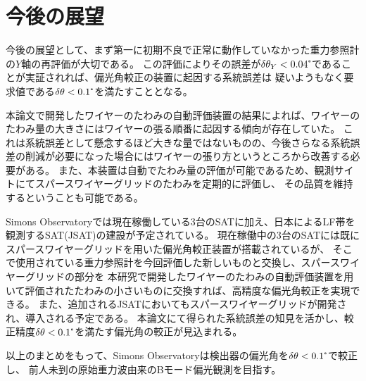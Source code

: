 \documentclass[../../main.tex]{subfiles}
\begin{document}
\section{今後の展望}
今後の展望として、まず第一に初期不良で正常に動作していなかった重力参照計の$Y$軸の再評価が大切である。
この評価によりその誤差が$\delta\theta_{Y}<0.04\tcdegree$であることが実証されれば、偏光角較正の装置に起因する系統誤差は
疑いようもなく要求値である$\delta\theta<0.1\tcdegree$を満たすこととなる。

本論文で開発したワイヤーのたわみの自動評価装置の結果によれば、ワイヤーのたわみ量の大きさにはワイヤーの張る順番に起因する傾向が存在していた。
これは系統誤差として懸念するほど大きな量ではないものの、今後さらなる系統誤差の削減が必要になった場合にはワイヤーの張り方というところから改善する必要がある。
また、本装置は自動でたわみ量の評価が可能であるため、観測サイトにてスパースワイヤーグリッドのたわみを定期的に評価し、
その品質を維持するということも可能である。

Simons Observatoryでは現在稼働している3台のSATに加え、日本によるLF帯を観測するSAT(JSAT)の建設が予定されている。
現在稼働中の3台のSATには既にスパースワイヤーグリッドを用いた偏光角較正装置が搭載されているが、
そこで使用されている重力参照計を今回評価した新しいものと交換し、スパースワイヤーグリッドの部分を
本研究で開発したワイヤーのたわみの自動評価装置を用いて評価されたたわみの小さいものに交換すれば、高精度な偏光角較正を実現できる。
また、追加されるJSATにおいてもスパースワイヤーグリッドが開発され、導入される予定である。
本論文にて得られた系統誤差の知見を活かし、較正精度$\delta\theta<0.1\tcdegree$を満たす偏光角の較正が見込まれる。

以上のまとめをもって、Simons Observatoryは検出器の偏光角を$\delta\theta<0.1\tcdegree$で較正し、
前人未到の原始重力波由来のBモード偏光観測を目指す。
\end{document}

